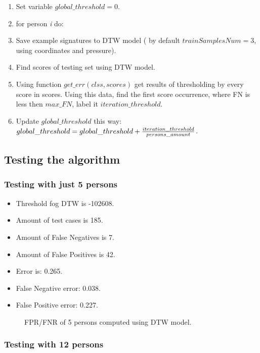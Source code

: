 \documentclass{article}
\begin{document}
\begin{enumerate}
  \item Set variable \( global\_threshold = 0\).
  \item for person 	\textit{i} do:
  \item \quad Save example signatures to DTW model ( by default \(trainSamplesNum = 3\), using coordinates and pressure).
  \item \quad Find scores of testing set using DTW model.
  \item \quad Using function \( get\_err( clss, scores ) \) get results of thresholding by every score in scores. Using this data, find the first score occurrence, where FN is less then \(max\_FN\), label it \( iteration\_threshold\).
  \item \quad Update \( global\_threshold\) this way: \( global\_threshold = global\_threshold + {iteration\_threshold \over persons\_amount} \).
\end{enumerate}


\subsection{Testing the algorithm}
\subsubsection{Testing with just 5 persons}

\begin{itemize}
  \item Threshold fog DTW is -102608.
  \item Amount of test cases is 185.
  \item Amount of False Negatives is 7.
  \item Amount of False Positives is 42.
  \item Error is: 0.265.
  \item False Negative error: 0.038.
  \item False Positive error: 0.227.
\end{itemize}

\begin{figure}[htbp] 
  \centering
  \def\svgscale{0.7}
  
  \caption{FPR/FNR of 5 persons computed using DTW model.}
  \label{DTW_5persons}
\end{figure}

\subsubsection{Testing with 12 persons}
\end{document}
